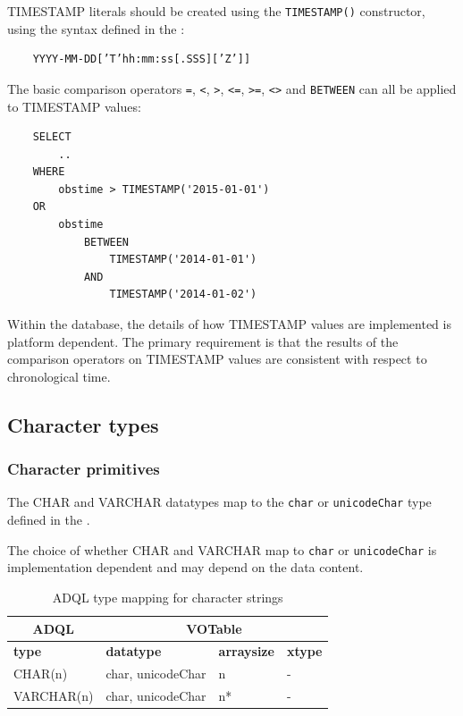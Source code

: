 \documentclass[11pt,a4paper]{ivoa}
\begin{document}
TIMESTAMP literals should be created using the \verb:TIMESTAMP():
constructor, using the syntax defined in the \DALISpec:
\begin{verbatim}
    YYYY-MM-DD[’T’hh:mm:ss[.SSS][’Z’]]
\end{verbatim}

The basic comparison operators \verb:=:, \verb:<:, \verb:>:, \verb:<=:, \verb:>=:,
\verb:<>: and \verb:BETWEEN: can all be applied to TIMESTAMP values:
\begin{verbatim}
    SELECT
        ..
    WHERE
        obstime > TIMESTAMP('2015-01-01')
    OR
        obstime
            BETWEEN
                TIMESTAMP('2014-01-01')
            AND
                TIMESTAMP('2014-01-02')
\end{verbatim}

Within the database, the details of how TIMESTAMP values are implemented
is platform dependent. The primary requirement is that the results of the
comparison operators on TIMESTAMP values are consistent with respect to
chronological time.

\subsection{Character types}
\label{sec:types.character}

\subsubsection{Character primitives}
\label{sec:types.character.primitive}

The CHAR and VARCHAR datatypes map to the \verb:char: or
\verb:unicodeChar: type defined in the \VOTableSpec.

The choice of whether CHAR and VARCHAR map to \verb:char: or
\verb:unicodeChar: is implementation dependent and may depend
on the data content.

\begin{table}[th]\footnotesize
    \begin{tabular}
        {|p{}|p{}|p{}|p{}|}
        \hline

        \hline
        \multicolumn{1}{|c|}{\textbf{ADQL}} &
        \multicolumn{3}{|c|}{\textbf{VOTable}}
        \tabularnewline
        
        \hline
        \textbf{type} &
        \textbf{datatype} &
        \textbf{arraysize} &
        \textbf{xtype}
        \tabularnewline

        \hline
        CHAR(n) &
        char, unicodeChar &
        n &
        -
        \tabularnewline

        \hline
        VARCHAR(n) &
        char, unicodeChar &
        n* &
        -
        \tabularnewline

        \hline
    \end{tabular}
    \caption{ADQL type mapping for character strings}
    \label{table:types.character.primitive}
\end{table}
\end{document}
